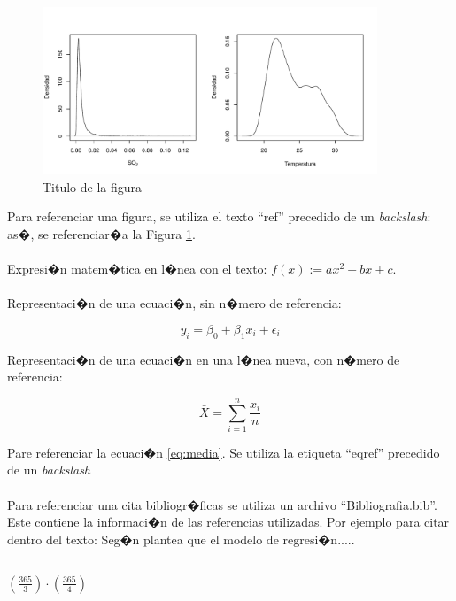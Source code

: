 \documentclass[letterpaper,12pt,onecolumn,titlepage]{article}
\begin{document}
\begin{figure}[!h]
    \begin{center}
        \includegraphics[width=10cm]{Figuras/Figura1.pdf}
        \caption{Titulo de la figura}
        \label{fig:Densidad}
    \end{center}
\end{figure}
 
Para referenciar una figura, se utiliza el texto ``ref'' precedido de un \textit{backslash}: as�, se referenciar�a la Figura \ref{fig:Densidad}.
\\
\\
Expresi�n matem�tica en l�nea con el texto: $f(x):=ax^2+bx+c$.
\\
\\ 
Representaci�n de una ecuaci�n, sin n�mero de referencia:
 
$$y_{i} = \beta_{0} + \beta_{1}x_{i} + \epsilon_{i}$$
 
Representaci�n de una ecuaci�n en una l�nea nueva, con n�mero de referencia:
 
\begin{equation}
 \bar{X} = \sum_{i=1}^{n}\frac{x_{i}}{n}
 \label{eq:media}
\end{equation}
 
Pare referenciar la ecuaci�n \eqref{eq:media}. Se utiliza la etiqueta ``eqref'' precedido de un \textit{backslash}
\\
\\
Para referenciar una cita bibliogr�ficas se utiliza un archivo ``Bibliografia.bib''. Este contiene la informaci�n de las referencias utilizadas. Por ejemplo para citar dentro del texto: Seg�n \cite{seber2012linear} plantea que el modelo de regresi�n.....

\subsection{}
 
$\left(\frac{365}{3}\right) \cdot \left(\frac{365}{4}\right) $
 
\end{document}
